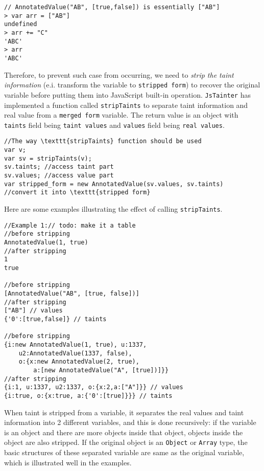\begin{verbatim}
// AnnotatedValue("AB", [true,false]) is essentially ["AB"]
> var arr = ["AB"] 
undefined
> arr += "C"
'ABC'
> arr
'ABC'
\end{verbatim}

Therefore, to prevent such case from occurring, we need to \textit{strip the taint information} (e.i. transform the variable to \texttt{stripped form}) to recover the original variable before putting them into JavaScript built-in operation. \texttt{JsTainter} has implemented a function called \texttt{stripTaints} to separate taint information and real value from a \texttt{merged form} variable. The return value is an object with \texttt{taints} field being \texttt{taint values} and \texttt{values} field being \texttt{real values}.

\begin{verbatim}
//The way \texttt{stripTaints} function should be used
var v;
var sv = stripTaints(v);
sv.taints; //access taint part
sv.values; //access value part
var stripped_form = new AnnotatedValue(sv.values, sv.taints)
//convert it into \texttt{stripped form}
\end{verbatim}

Here are some examples illustrating the effect of calling \texttt{stripTaints}. 

\begin{verbatim}
//Example 1:// todo: make it a table
//before stripping
AnnotatedValue(1, true)
//after stripping
1
true

//before stripping
[AnnotatedValue("AB", [true, false])]
//after stripping
["AB"] // values
{'0':[true,false]} // taints

//before stripping
{i:new AnnotatedValue(1, true), u:1337,
    u2:AnnotatedValue(1337, false),
    o:{x:new AnnotatedValue(2, true), 
        a:[new AnnotatedValue("A", [true])]}}
//after stripping
{i:1, u:1337, u2:1337, o:{x:2,a:["A"]}} // values
{i:true, o:{x:true, a:{'0':[true]}}} // taints
\end{verbatim}

When taint is stripped from a variable, it separates the real values and taint information into 2 different variables, and this is done recursively: if the variable is an object and there are more objects inside that object, objects inside the object are also stripped. If the original object is an \texttt{Object} or \texttt{Array} type, the basic structures of these separated variable are same as the original variable, which is illustrated well in the examples. 

